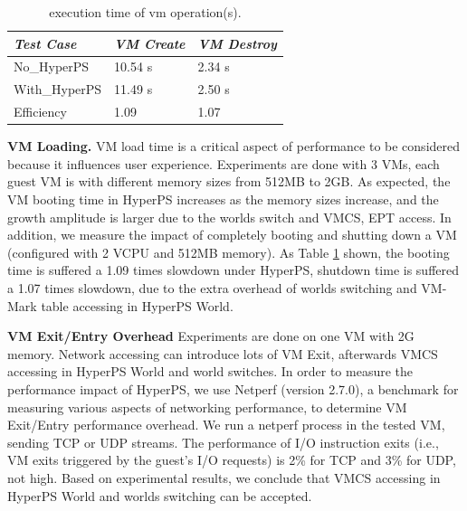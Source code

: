 ﻿\documentclass[conference]{IEEEtran}
\begin{document}
\begin{table}
\centering
\caption{execution time of vm operation(s).}\label{tabvm}
\begin{tabular}{p{2cm}|p{1.4cm}|p{1.5cm}}
\hline
{\itshape\bfseries  Test Case} & {\itshape\bfseries VM Create} & {\itshape\bfseries VM Destroy} \\
\hline
No\_HyperPS & 10.54 s &  2.34 s\\
\hline
With\_HyperPS & 11.49 s & 2.50 s\\ 
\hline
Efficiency & 1.09 & 1.07 \\
\hline
\end{tabular}
\end{table}


\textbf {VM Loading.}
VM load time is a critical aspect of performance to be considered because it influences user experience.
 Experiments are done with 3 VMs, each guest VM is with different memory sizes from 512MB to 2GB.
 As expected, the VM booting time in HyperPS increases as the memory sizes increase, and the growth amplitude is larger due to the worlds switch and VMCS, EPT access.
In addition, we measure the impact of completely booting and shutting down a VM (configured with 2 VCPU and 512MB memory). As Table \ref{tabvm} shown, the booting time is suffered a 1.09 times slowdown under HyperPS, shutdown time is suffered a 1.07 times slowdown, due to the extra overhead of worlds switching and VM-Mark table accessing in HyperPS World. %


\iffalse
\textbf {VM Exit/Entry Overhead}
Experiments are done on one VM with 2G memory. Network accessing can introduce lots of VM Exit, afterwards VMCS accessing in HyperPS World and world switches. In order to measure the performance impact of HyperPS, we use Netperf (version 2.7.0), a benchmark for measuring various aspects of networking performance, to determine VM Exit/Entry performance overhead. We run a netperf process in the tested VM, sending TCP or UDP streams. The performance of I/O instruction exits (i.e., VM exits triggered by the guest's I/O requests) is 2\% for TCP and 3\% for UDP, not high. 
Based on experimental results, we conclude that VMCS accessing in HyperPS World and worlds switching can be accepted.
\end{document}
